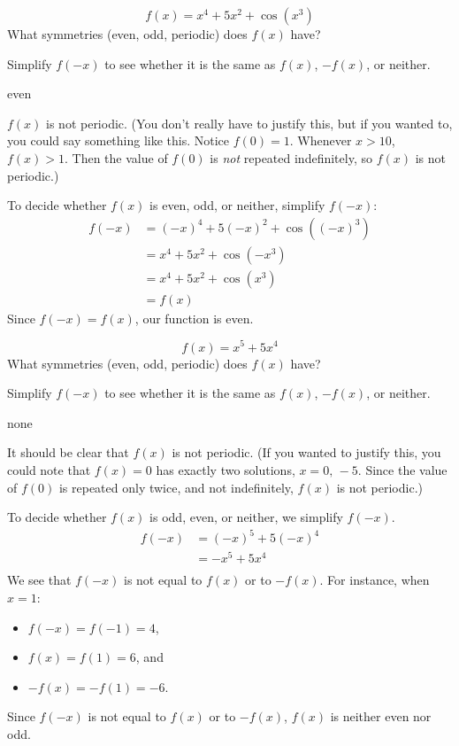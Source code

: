 
\begin{Mquestion}\label{s3.6.4eqfirst}
\[f(x)=x^4+5x^2+\cos\left(x^3\right)\]
What symmetries (even, odd, periodic) does $f(x)$ have?
\end{Mquestion}
\begin{hint}
Simplify $f(-x)$ to see whether it is the same as $f(x)$, $-f(x)$, or neither.
\end{hint}
\begin{answer}
even
\end{answer}
\begin{solution}
$f(x)$ is not periodic. (You don't really have to justify this, but if you wanted to, you could say something like this. Notice $f(0)=1$. Whenever $x>10$, $f(x)>1$. Then the value of $f(0)$ is \emph{not} repeated indefinitely, so $f(x)$ is not periodic.)

To decide whether $f(x)$ is even, odd, or neither, simplify $f(-x)$:
\begin{align*}
f(-x)&=(-x)^4+5(-x)^2+\cos\left((-x)^3\right)\\
&=x^4+5x^2+\cos(-x^3)\\
&=x^4+5x^2+\cos(x^3)\\
&=f(x)
\end{align*}
Since $f(-x)=f(x)$, our function is even.
\end{solution}

\begin{question}
\[f(x)=x^5+5x^4\]
What symmetries (even, odd, periodic) does $f(x)$ have?
\end{question}
\begin{hint}
Simplify $f(-x)$ to see whether it is the same as $f(x)$, $-f(x)$, or neither.
\end{hint}
\begin{answer}
none
\end{answer}
\begin{solution}
It should be clear that $f(x)$ is not periodic.  (If you wanted to justify this, you could note that $f(x)=0$ has exactly two solutions, $x=0,\,-{5}$. Since the value of $f(0)$ is repeated only twice, and not indefinitely, $f(x)$ is not periodic.)

To decide whether $f(x)$ is odd, even, or neither, we simplify $f(-x)$.
\begin{align*}
f(-x)&=(-x)^5+5(-x)^{4}\\
&=-x^5+5x^4\\
\end{align*}
We see that  $f(-x)$ is not equal to $f(x)$ or to $-f(x)$.
For instance, when $x=1$:
\begin{itemize}
\item $f(-x)=f(-1)=4$,
\item $f(x)=f(1)=6$, and
\item $-f(x)=-f(1)=-6$. \end{itemize}
Since $f(-x)$ is not equal to $f(x)$ or to $-f(x)$, $f(x)$ is neither even nor odd.
\end{solution}


